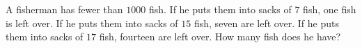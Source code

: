 A fisherman has fewer than $1000$ fish. If he puts them into sacks of $7$ fish, one fish is left over. If he puts them into sacks of $15$ fish, seven are left over. If he puts them into sacks of $17$ fish, fourteen are left over. How many fish does he have?
